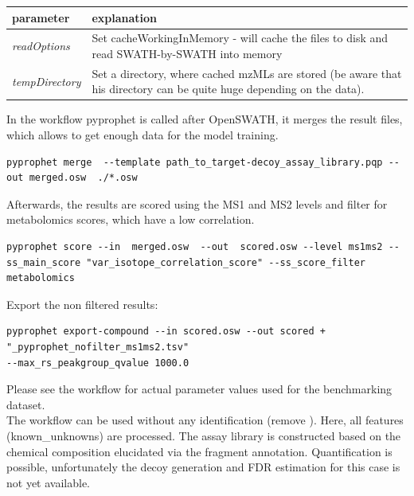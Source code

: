 \begin{center}
\begin{tabular*}{\textwidth}{ p{5.5cm}|p{10.5cm} }
\textbf{parameter} & \textbf{explanation} \\ \hline
\textit{readOptions} & Set cacheWorkingInMemory - will cache the files to disk and read SWATH-by-SWATH into memory\\
\textit{tempDirectory} &  Set a directory, where cached mzMLs are stored (be aware that his directory can be quite huge depending on the data). \\
\end{tabular*}
\end{center} 

\noindent In the workflow pyprophet is called after OpenSWATH, it merges the result files, which allows to get enough data for the model training. 

\begin{listing}
\begin{verbatim}
pyprophet merge  --template path_to_target-decoy_assay_library.pqp --out merged.osw  ./*.osw
\end{verbatim}
\end{listing}

\noindent Afterwards, the results are scored using the MS1 and MS2 levels and filter for metabolomics scores, which have a low correlation. 

\begin{listing}
\begin{verbatim}
pyprophet score --in  merged.osw  --out  scored.osw --level ms1ms2 --ss_main_score "var_isotope_correlation_score" --ss_score_filter metabolomics
\end{verbatim}
\end{listing}
\noindent Export the non filtered results: 

\begin{listing}
\begin{verbatim}
pyprophet export-compound --in scored.osw --out scored + "_pyprophet_nofilter_ms1ms2.tsv" 
--max_rs_peakgroup_qvalue 1000.0
\end{verbatim}
\end{listing}
\noindent Please see the workflow for actual parameter values used for the benchmarking dataset. \\


\noindent  The workflow can be used without any identification (remove ). Here, all features (known\_unknowns) are processed. The assay library is constructed based on the chemical composition elucidated via the fragment annotation. Quantification is possible, unfortunately the decoy generation and FDR estimation for this case is not yet available. 


